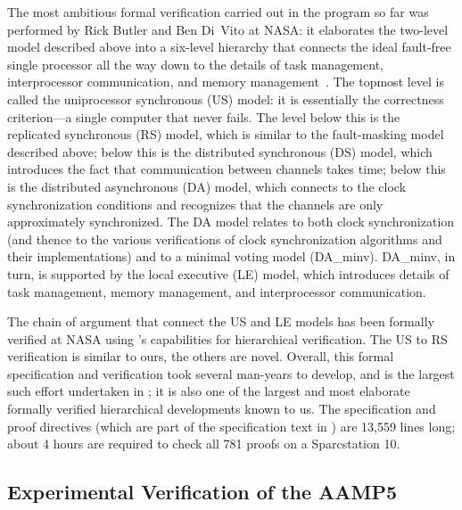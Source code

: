 The most ambitious formal verification carried out in the program so
far was performed by Rick Butler and Ben Di~Vito at NASA: it
elaborates the two-level model described above into a six-level
hierarchy that connects the ideal fault-free single processor all the
way down to the details of task management, interprocessor
communication, and memory
management~\cite{DiVito&Butler:Phase3,DiVito-DCCA-3}.  The topmost
level is called the uniprocessor synchronous (US) model: it is
essentially the correctness criterion---a single computer that never
fails.  The level below this is the replicated synchronous (RS)
model, which is similar to the fault-masking model described above;
below this is the distributed synchronous (DS) model, which
introduces the fact that communication between channels takes time;
below this is the distributed asynchronous (DA) model, which connects
to the clock synchronization conditions and recognizes that the
channels are only approximately synchronized.  The DA model relates
to both clock synchronization (and thence to the various
verifications of clock synchronization algorithms and their
implementations) and to a minimal voting model (DA\_minv).  DA\_minv,
in turn, is supported by the local executive (LE) model, which
introduces details of task management, memory management, and
interprocessor communication.


The chain of argument that connect the US and LE models has been
formally verified at NASA using \ehdm's capabilities for hierarchical
verification.  The US to RS verification is similar to ours, the
others are novel.  Overall, this formal specification and
verification took several man-years to develop, and is the largest
such effort undertaken in \ehdm; it is also one of the largest and most
elaborate formally verified hierarchical developments known to us.
The specification and proof directives (which are part of the
specification text in \ehdm) are 13,559 lines long; about 4 hours are
required to check all 781 proofs on a {\sc Sparc}station 10.

\subsection{Experimental Verification of the AAMP5}

